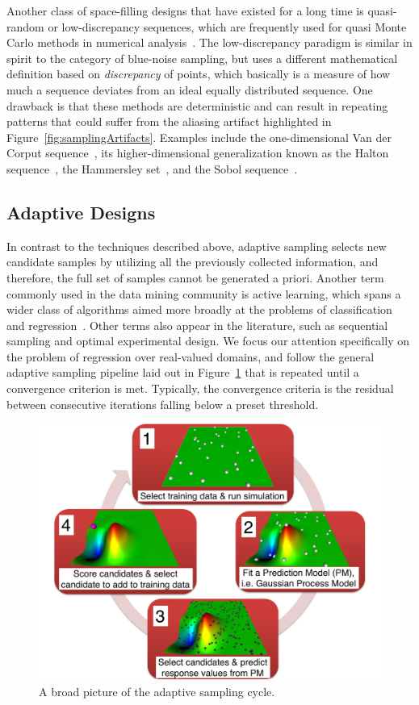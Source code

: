 Another class of space-filling designs that have existed for a long time is quasi-random or low-discrepancy sequences, which are frequently used for quasi Monte Carlo methods in numerical analysis~\cite{Niederreiter1992}.
%
The low-discrepancy paradigm is similar in spirit to the category of blue-noise sampling, but uses a different mathematical definition based on \textit{discrepancy} of points, which basically is a measure of how much a sequence deviates from an ideal equally distributed sequence.
%
One drawback is that these methods are deterministic and can result in repeating patterns that could suffer from the aliasing artifact highlighted in Figure~\ref{fig:samplingArtifacts}.
%
Examples include the one-dimensional Van der Corput sequence~\cite{vanderCorput1935}, its higher-dimensional generalization known as the Halton sequence~\cite{Halton1964,BraatenWeller1979}, the Hammersley set~\cite{HammersleyHandscomb1964}, and the Sobol sequence~\cite{Sobol1967}.

\subsection{Adaptive Designs}
\label{sec:adaptiveSampling}

In contrast to the techniques described above, adaptive sampling selects new candidate samples by utilizing all the previously collected information, and therefore, the full set of samples cannot be generated a priori.
%
Another term commonly used in the data mining community is active learning, which spans a wider class of algorithms aimed more broadly at the problems of classification and regression~\cite{Settles2009}.
%
Other terms also appear in the literature, such as sequential sampling and optimal experimental design.
%
We focus our attention specifically on the problem of regression over real-valued domains, and follow the general adaptive sampling pipeline laid out in Figure~\ref{fig:asCycle} that is repeated until a convergence criterion is met.
%
Typically, the convergence criteria is the residual between consecutive iterations falling below a preset threshold.

\begin{figure}[t]
  \centering
  \includegraphics[width=.75\textwidth]{figs/chap3/pipeline}
  \caption[Adaptive Sampling Cycle]{A broad picture of the adaptive sampling
  cycle.}
  \label{fig:asCycle}
\end{figure}

